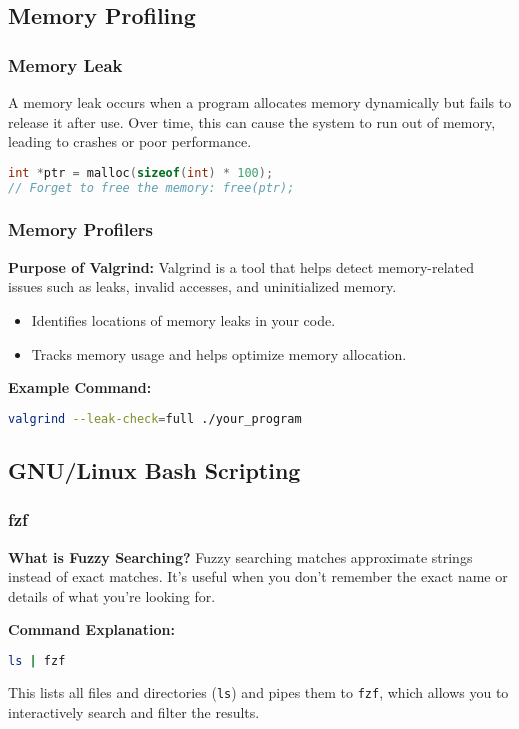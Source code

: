 \documentclass{article}
\begin{document}
\subsection{Memory Profiling}

\subsubsection{Memory Leak}
A memory leak occurs when a program allocates memory dynamically but fails to release it after use. Over time, this can cause the system to run out of memory, leading to crashes or poor performance.
\begin{lstlisting}[language=C]
int *ptr = malloc(sizeof(int) * 100);
// Forget to free the memory: free(ptr);
\end{lstlisting}

\subsubsection{Memory Profilers}
\textbf{Purpose of Valgrind:}
Valgrind is a tool that helps detect memory-related issues such as leaks, invalid accesses, and uninitialized memory.
\begin{itemize}
    \item Identifies locations of memory leaks in your code.
    \item Tracks memory usage and helps optimize memory allocation.
\end{itemize}
\textbf{Example Command:}
\begin{lstlisting}[language=bash]
valgrind --leak-check=full ./your_program
\end{lstlisting}

\subsection{GNU/Linux Bash Scripting}

\subsubsection{fzf}
\textbf{What is Fuzzy Searching?}
Fuzzy searching matches approximate strings instead of exact matches. It’s useful when you don’t remember the exact name or details of what you’re looking for.

\textbf{Command Explanation:}
\begin{lstlisting}[language=bash]
ls | fzf
\end{lstlisting}
This lists all files and directories (\texttt{ls}) and pipes them to \texttt{fzf}, which allows you to interactively search and filter the results.
\end{document}
